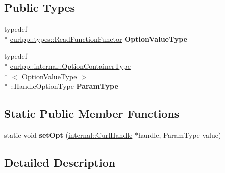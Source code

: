 \subsection*{Public Types}
\begin{DoxyCompactItemize}
\item 
\hypertarget{classcurlpp_1_1internal_1_1OptionSetter_3_01curlpp_1_1types_1_1ReadFunctionFunctor_00_01CURLOPT__READFUNCTION_01_4_ada10c704d804db86596411be7daa0641}{typedef \\*
\hyperlink{classutilspp_1_1Functor}{curlpp\-::types\-::\-Read\-Function\-Functor} {\bfseries Option\-Value\-Type}}\label{classcurlpp_1_1internal_1_1OptionSetter_3_01curlpp_1_1types_1_1ReadFunctionFunctor_00_01CURLOPT__READFUNCTION_01_4_ada10c704d804db86596411be7daa0641}

\item 
\hypertarget{classcurlpp_1_1internal_1_1OptionSetter_3_01curlpp_1_1types_1_1ReadFunctionFunctor_00_01CURLOPT__READFUNCTION_01_4_a193fe22a646a759ae62518ffb27673c5}{typedef \\*
\hyperlink{structcurlpp_1_1internal_1_1OptionContainerType}{curlpp\-::internal\-::\-Option\-Container\-Type}\\*
$<$ \hyperlink{classutilspp_1_1Functor}{Option\-Value\-Type} $>$\\*
\-::Handle\-Option\-Type {\bfseries Param\-Type}}\label{classcurlpp_1_1internal_1_1OptionSetter_3_01curlpp_1_1types_1_1ReadFunctionFunctor_00_01CURLOPT__READFUNCTION_01_4_a193fe22a646a759ae62518ffb27673c5}

\end{DoxyCompactItemize}
\subsection*{Static Public Member Functions}
\begin{DoxyCompactItemize}
\item 
\hypertarget{classcurlpp_1_1internal_1_1OptionSetter_3_01curlpp_1_1types_1_1ReadFunctionFunctor_00_01CURLOPT__READFUNCTION_01_4_a218fe0913ea0107c1e7ada2451c04b35}{static void {\bfseries set\-Opt} (\hyperlink{classcurlpp_1_1internal_1_1CurlHandle}{internal\-::\-Curl\-Handle} $\ast$handle, Param\-Type value)}\label{classcurlpp_1_1internal_1_1OptionSetter_3_01curlpp_1_1types_1_1ReadFunctionFunctor_00_01CURLOPT__READFUNCTION_01_4_a218fe0913ea0107c1e7ada2451c04b35}

\end{DoxyCompactItemize}


\subsection{Detailed Description}
